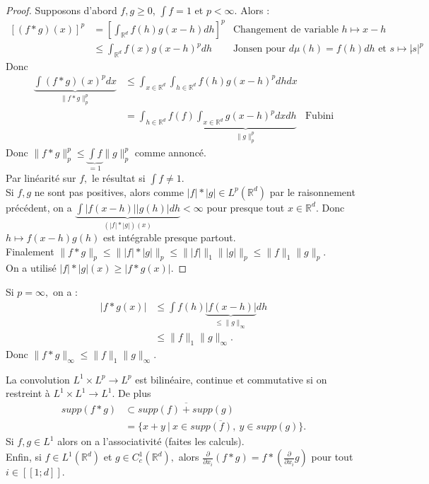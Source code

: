 \begin{proof}
    Supposons d'abord $f,g\ge 0$, $\int f=1$ et $p<\infty .$ Alors :
    \begin{align*}
        \left[ \left( f*g \right) (x) \right] ^p &= \left[ \int_{\mathbb{R} ^d}f(h)g(x-h)dh \right] ^p &\text{Changement de variable $h\mapsto x-h$ }\\
                                                 &\le \int_{\mathbb{R} ^d}f(x)g(x-h)^pdh &\text{Jonsen pour $d\mu(h)=f(h)dh$ et $s\mapsto |s| ^p$  }.
    \end{align*}
    Donc
    \begin{align*}
        \underbrace{\int\left( f*g \right) (x)^pdx}_{\|f*g\|_p^p}&\le \int_{x\in \mathbb{R} ^d}\int_{h\in \mathbb{R} ^d}^{} f(h)g(x-h)^pdhdx\\
                                                                 &=\int_{h\in \mathbb{R} ^d}f(f)\underbrace{\int_{x\in \mathbb{R} ^d}g(x-h)^pdxdh}_{\|g\|^p_p} &\text{Fubini}
    \end{align*}
    Donc $\|f*g\|^p_p\le \underbrace{\int f}_{=1}\|g\|^p_p$ comme annoncé.\\
    Par linéarité sur $f,$ le résultat si $\int f\neq 1.$ \\

    Si $f,g$ ne sont pas positives, alors comme $|f| *|g| \in L^p(\mathbb{R} ^d)$ par le raisonnement précédent, on a $\underbrace{\int |f(x-h)| |g(h)| dh}_{\left( |f| *|g|  \right) (x)}<\infty $ pour presque tout $x\in \mathbb{R} ^d.$ Donc $h\mapsto f(x-h)g(h)$ est intégrable presque partout. \\
    Finalement $\|f*g\|_p\le \||f| *|g| \|_p\le \||f| \|_1\||g| \|_p\le \|f\|_1\|g\|_p.$\\
    On a utilisé $|f| *|g| (x)\ge |f*g(x)|. $
\end{proof}
\begin{remarque}
    Si $p=\infty ,$ on a :
    \begin{align*}
        |f*g(x)| &\le \int f(h)\underbrace{|f(x-h)| }_{\le \|g\|_\infty }dh\\
                 &\le \|f\|_1\|g\|_\infty .
    \end{align*}
    Donc $\|f*g\|_\infty \le \|f\|_1\|g\|_\infty.$
\end{remarque}
La convolution $L^1\times L^p\to L^p$ est bilinéaire, continue et commutative si on restreint à $L^1\times L^1\to L^1.$ De plus
\begin{align*}
    supp(f*g)&\subset \overline{supp(f)+supp(g)}\\
             &=\overline{\{x+y\ |\ x\in supp(f),~y\in supp(g)\} }.
\end{align*}
Si $f,g\in L^1$ alors on a l'associativité (faites les calculs).\\
Enfin, si $f\in L^1(\mathbb{R} ^d)$ et $g\in C^1_c(\mathbb{R} ^d),$ alors $\frac{\partial}{\partial x_i}\left( f*g \right) =f*\left( \frac{\partial}{\partial x_i}g \right) $ pour tout $i\in [\![1;d]\!].$

